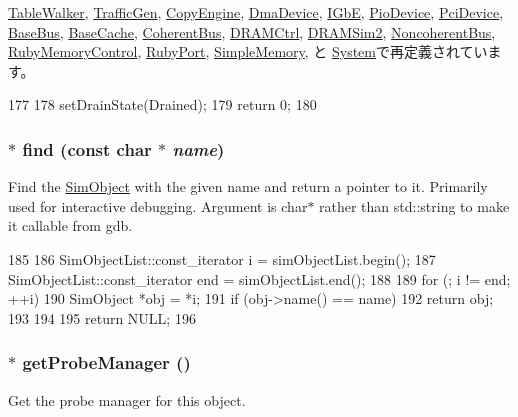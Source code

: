 \hyperlink{classArmISA_1_1TableWalker_aa8a18d230dba7a674ac8a0b4f35bc36a}{TableWalker}, \hyperlink{classTrafficGen_aa8a18d230dba7a674ac8a0b4f35bc36a}{TrafficGen}, \hyperlink{classCopyEngine_a6bf479c521c7c3eb473822d953275b26}{CopyEngine}, \hyperlink{classDmaDevice_a6bf479c521c7c3eb473822d953275b26}{DmaDevice}, \hyperlink{classIGbE_aa8a18d230dba7a674ac8a0b4f35bc36a}{IGbE}, \hyperlink{classPioDevice_a6bf479c521c7c3eb473822d953275b26}{PioDevice}, \hyperlink{classPciDevice_aa8a18d230dba7a674ac8a0b4f35bc36a}{PciDevice}, \hyperlink{classBaseBus_ac8c1510f7e1591e75a5c79b4b873f6b4}{BaseBus}, \hyperlink{classBaseCache_aa8a18d230dba7a674ac8a0b4f35bc36a}{BaseCache}, \hyperlink{classCoherentBus_aa8a18d230dba7a674ac8a0b4f35bc36a}{CoherentBus}, \hyperlink{classDRAMCtrl_aa8a18d230dba7a674ac8a0b4f35bc36a}{DRAMCtrl}, \hyperlink{classDRAMSim2_aa8a18d230dba7a674ac8a0b4f35bc36a}{DRAMSim2}, \hyperlink{classNoncoherentBus_aa8a18d230dba7a674ac8a0b4f35bc36a}{NoncoherentBus}, \hyperlink{classRubyMemoryControl_aa8a18d230dba7a674ac8a0b4f35bc36a}{RubyMemoryControl}, \hyperlink{classRubyPort_aa8a18d230dba7a674ac8a0b4f35bc36a}{RubyPort}, \hyperlink{classSimpleMemory_aa8a18d230dba7a674ac8a0b4f35bc36a}{SimpleMemory}, と \hyperlink{classSystem_aa8a18d230dba7a674ac8a0b4f35bc36a}{System}で再定義されています。


\begin{DoxyCode}
177 {
178     setDrainState(Drained);
179     return 0;
180 }
\end{DoxyCode}
\hypertarget{classSimObject_a4f441caa815630d644e19ee6bc8fce44}{
\subsubsection[{find}]{ $\ast$ find (const char $\ast$ {\em name})}}
\label{classSimObject_a4f441caa815630d644e19ee6bc8fce44}
Find the \hyperlink{classSimObject}{SimObject} with the given name and return a pointer to it. Primarily used for interactive debugging. Argument is char$\ast$ rather than std::string to make it callable from gdb. 


\begin{DoxyCode}
185 {
186     SimObjectList::const_iterator i = simObjectList.begin();
187     SimObjectList::const_iterator end = simObjectList.end();
188 
189     for (; i != end; ++i) {
190         SimObject *obj = *i;
191         if (obj->name() == name)
192             return obj;
193     }
194 
195     return NULL;
196 }
\end{DoxyCode}
\hypertarget{classSimObject_aca474da5df36cfb4df4bfcdbb4df8bf9}{
\subsubsection[{getProbeManager}]{ $\ast$ getProbeManager ()}}
\label{classSimObject_aca474da5df36cfb4df4bfcdbb4df8bf9}
Get the probe manager for this object. 

